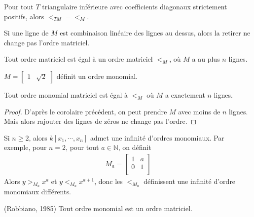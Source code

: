         \begin{coro}
            Pour tout $T$ triangulaire inférieure avec coefficients diagonaux strictement positifs, alors $<_{TM} = <_M$.
        \end{coro}
        \begin{coro}
            Si une ligne de $M$ est combinaison linéaire des lignes au dessus, alors la retirer ne change pas l'ordre matriciel.
        \end{coro}
        \begin{coro}
            Tout ordre matriciel est égal à un ordre matriciel $<_M$, où $M$ a au plus $n$ lignes.
        \end{coro}
        \begin{expl}
            $M = \begin{bmatrix} 1 & \sqrt{2} \end{bmatrix}$ définit un ordre monomial.
        \end{expl}
        \begin{coro}
            Tout ordre monomial matriciel est égal à $<_M$ où $M$ a exactement $n$ lignes.
        \end{coro}
        \begin{proof}
            D'après le corolaire précédent, on peut prendre $M$ avec moins de $n$ lignes. Mais alors rajouter des lignes de zéros ne change pas l'ordre.
        \end{proof}
        \begin{remq}
            Si $n \geq 2$, alors $k[x_1, \cdots, x_n]$ admet une infinité d'ordres monomiaux. Par exemple, pour $n = 2$, pour tout $a \in \mathbb{N}$, on définit
            \begin{align*}
                M_a =
                \begin{bmatrix}
                    1 & a \\
                    0 & 1 \\
                \end{bmatrix}
            \end{align*}
            Alors $y >_{M_a} x^a$ et $y <_{M_a} x^{a+1}$, donc les $<_{M_a}$ définissent une infinité d'ordre monomiaux différents.
        \end{remq}
        \begin{theo} (Robbiano, 1985)
            Tout ordre monomial est un ordre matriciel.
        \end{theo}
